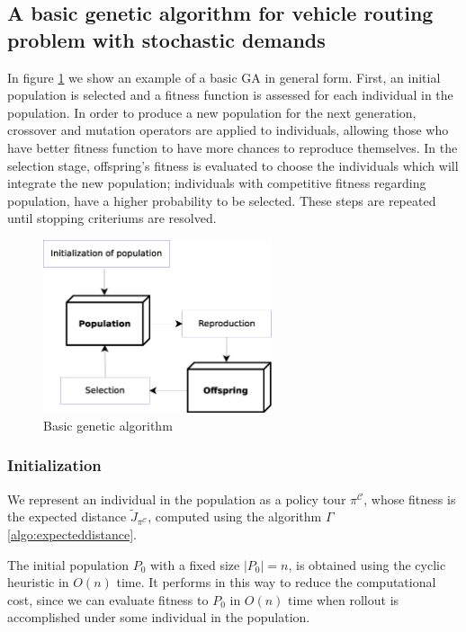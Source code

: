 \subsection{A basic genetic algorithm for vehicle routing problem with stochastic demands}

In figure \ref{fig:ga_basic} we show an example of a basic GA in general form. First, an initial population is selected and a fitness function is assessed for each individual in the population. In order to produce a new population for the next generation, crossover and mutation operators are applied to individuals, allowing those who have better fitness function to have more chances to reproduce themselves. In the selection stage, offspring's fitness is evaluated to choose the individuals which will integrate the new population; individuals with competitive fitness regarding population, have a higher probability to be selected. These steps are repeated until stopping criteriums are resolved.

\begin{figure}[!htbp]
  \begin{center}
   \includegraphics[width=0.6\textwidth]{Images/Chapter3/ga_basic.eps}
  \end{center}
    \caption{Basic genetic algorithm}\label{fig:ga_basic}
\end{figure}

\subsubsection*{Initialization}

We represent an individual in the population as a policy tour $\pi^\mathcal{C}$, whose fitness is the expected distance $\tilde{J}_{\pi^\mathcal{C}}$, computed using the algorithm $\Gamma$ \ref{algo:expecteddistance}.

The initial population $P_0$ with a fixed size $|P_0| = n$, is obtained using the cyclic heuristic in $O(n)$ time. It performs in this way to reduce the computational cost, since we can evaluate fitness to $P_0$ in $O(n)$ time when rollout is accomplished under some individual in the population.


